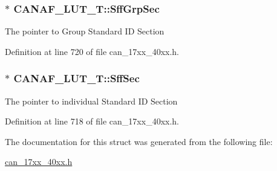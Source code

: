 \subsubsection[{\texorpdfstring{Sff\+Grp\+Sec}{SffGrpSec}}]{$\ast$ C\+A\+N\+A\+F\+\_\+\+L\+U\+T\+\_\+\+T\+::\+Sff\+Grp\+Sec}\hypertarget{structCANAF__LUT__T_abcfa9b72b2a981e655551810d52c5fff}{}\label{structCANAF__LUT__T_abcfa9b72b2a981e655551810d52c5fff}
The pointer to Group Standard ID Section 

Definition at line 720 of file can\+\_\+17xx\+\_\+40xx.\+h.

\subsubsection[{\texorpdfstring{Sff\+Sec}{SffSec}}]{$\ast$ C\+A\+N\+A\+F\+\_\+\+L\+U\+T\+\_\+\+T\+::\+Sff\+Sec}\hypertarget{structCANAF__LUT__T_a34daf657f3d2a50e721daa0ab7dee994}{}\label{structCANAF__LUT__T_a34daf657f3d2a50e721daa0ab7dee994}
The pointer to individual Standard ID Section 

Definition at line 718 of file can\+\_\+17xx\+\_\+40xx.\+h.



The documentation for this struct was generated from the following file\+:\begin{DoxyCompactItemize}
\item 
\hyperlink{can__17xx__40xx_8h}{can\+\_\+17xx\+\_\+40xx.\+h}\end{DoxyCompactItemize}
